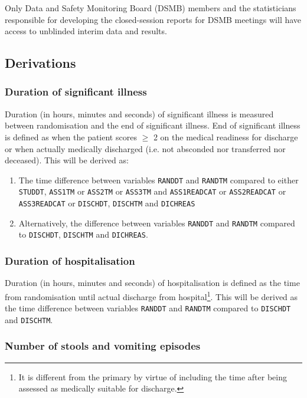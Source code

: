 \documentclass[a4paper]{article}
\begin{document}
Only Data and Safety Monitoring Board (DSMB) members and the statisticians responsible for developing the  closed-session reports for DSMB meetings will have access to unblinded interim data and results.

\subsection{Derivations}

\subsubsection{Duration of significant illness}

Duration (in hours, minutes and seconds) of significant illness is measured between randomisation and the end of significant illness.
End of significant illness is defined as when the patient scores $\ge$ 2 on the medical readiness for discharge or when actually medically discharged (i.e. not absconded nor transferred nor deceased).
This will be derived as:

\begin{enumerate}
    \item The time difference between variables \texttt{RANDDT} and \texttt{RANDTM} compared to either \texttt{STUDDT}, \texttt{ASS1TM} or \texttt{ASS2TM} or \texttt{ASS3TM} and \texttt{ASS1READCAT} or \texttt{ASS2READCAT} or \texttt{ASS3READCAT} or \texttt{DISCHDT}, \texttt{DISCHTM} and \texttt{DICHREAS}
    \item Alternatively, the difference between variables \texttt{RANDDT} and \texttt{RANDTM} compared to \texttt{DISCHDT}, \texttt{DISCHTM} and \texttt{DICHREAS}.
\end{enumerate}

\subsubsection{Duration of hospitalisation}

Duration (in hours, minutes and seconds) of hospitalisation is defined as the time from randomisation until actual discharge from hospital\footnote{It is different from the primary by virtue of including the time after being assessed as medically suitable for discharge.}.
This will be derived as the time difference between variables \texttt{RANDDT} and \texttt{RANDTM} compared to \texttt{DISCHDT} and \texttt{DISCHTM}.

\subsubsection{Number of stools and vomiting episodes}
\end{document}
